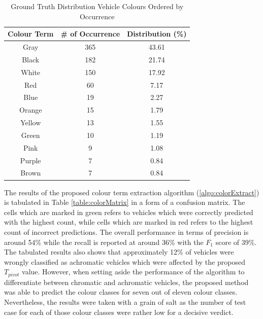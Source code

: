 \begin{table}[bht!]
\centering
\caption{Ground Truth Distribution Vehicle Colours Ordered by Occurrence}
\label{table:colorDist}
\begin{tabular}{ccc}
\toprule
Colour Term & \# of Occurrence & Distribution (\%)   \\
\midrule
Gray       & 365       & 43.61  \\
Black      & 182       & 21.74  \\
White      & 150       & 17.92  \\
Red        & 60        & 7.17   \\
Blue       & 19        & 2.27   \\
Orange     & 15        & 1.79   \\
Yellow     & 13        & 1.55   \\
Green      & 10        & 1.19   \\
Pink       & 9         & 1.08   \\
Purple     & 7         & 0.84   \\
Brown      & 7         & 0.84   \\
\bottomrule
\end{tabular}
\end{table}




The results of the proposed colour term extraction algorithm (\ref{algo:colorExtract}) is tabulated in Table \ref{table:colorMatrix} in a form of a confusion matrix. The cells which are marked in green refers to vehicles which were correctly predicted with the highest count, while cells which are marked in red refers to the highest count of incorrect predictions. The overall performance in terms of precision is around 54\% while the recall is reported at around 36\% with the $F_1$ score of 39\%. The tabulated results also shows that approximately 12\% of vehicles were wrongly classified as achromatic vehicles which were affected by the proposed $T_{pivot}$ value. However, when setting aside the performance of the algorithm to differentiate between chromatic and achromatic vehicles, the proposed method was able to predict the colour classes for seven out of eleven colour classes. Nevertheless, the results were taken with a grain of salt as the number of test case for each of those colour classes were rather low for a decisive verdict.

